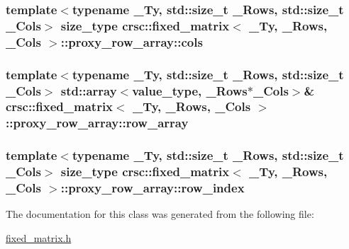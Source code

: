 \subsubsection[{\texorpdfstring{cols}{cols}}]{\setlength{\rightskip}{0pt plus 5cm}template$<$typename \+\_\+\+Ty, std\+::size\+\_\+t \+\_\+\+Rows, std\+::size\+\_\+t \+\_\+\+Cols$>$ {\bf size\+\_\+type} {\bf crsc\+::fixed\+\_\+matrix}$<$ \+\_\+\+Ty, \+\_\+\+Rows, \+\_\+\+Cols $>$\+::proxy\+\_\+row\+\_\+array\+::cols\hspace{0.3cm}{\ttfamily [private]}}\hypertarget{classcrsc_1_1fixed__matrix_1_1proxy__row__array_a18e4e3a22600581c6a8c7a667b653816}{}\label{classcrsc_1_1fixed__matrix_1_1proxy__row__array_a18e4e3a22600581c6a8c7a667b653816}
\subsubsection[{\texorpdfstring{row\+\_\+array}{row_array}}]{\setlength{\rightskip}{0pt plus 5cm}template$<$typename \+\_\+\+Ty, std\+::size\+\_\+t \+\_\+\+Rows, std\+::size\+\_\+t \+\_\+\+Cols$>$ std\+::array$<${\bf value\+\_\+type}, \+\_\+\+Rows$\ast$\+\_\+\+Cols$>$\& {\bf crsc\+::fixed\+\_\+matrix}$<$ \+\_\+\+Ty, \+\_\+\+Rows, \+\_\+\+Cols $>$\+::proxy\+\_\+row\+\_\+array\+::row\+\_\+array\hspace{0.3cm}{\ttfamily [private]}}\hypertarget{classcrsc_1_1fixed__matrix_1_1proxy__row__array_a6a41ce5685b40e0bb1b35f99298a9d9b}{}\label{classcrsc_1_1fixed__matrix_1_1proxy__row__array_a6a41ce5685b40e0bb1b35f99298a9d9b}
\subsubsection[{\texorpdfstring{row\+\_\+index}{row_index}}]{\setlength{\rightskip}{0pt plus 5cm}template$<$typename \+\_\+\+Ty, std\+::size\+\_\+t \+\_\+\+Rows, std\+::size\+\_\+t \+\_\+\+Cols$>$ {\bf size\+\_\+type} {\bf crsc\+::fixed\+\_\+matrix}$<$ \+\_\+\+Ty, \+\_\+\+Rows, \+\_\+\+Cols $>$\+::proxy\+\_\+row\+\_\+array\+::row\+\_\+index\hspace{0.3cm}{\ttfamily [private]}}\hypertarget{classcrsc_1_1fixed__matrix_1_1proxy__row__array_a397eeeb06f56487a8923d6eb4a220235}{}\label{classcrsc_1_1fixed__matrix_1_1proxy__row__array_a397eeeb06f56487a8923d6eb4a220235}


The documentation for this class was generated from the following file\+:\begin{DoxyCompactItemize}
\item 
\hyperlink{fixed__matrix_8h}{fixed\+\_\+matrix.\+h}\end{DoxyCompactItemize}
